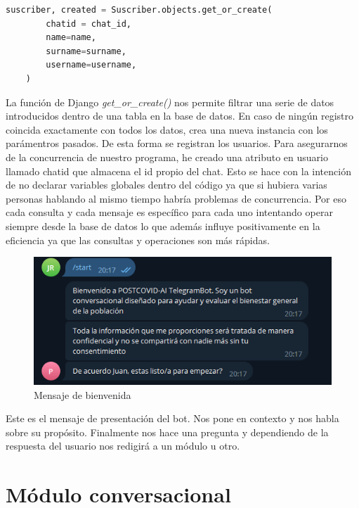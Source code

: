 \begin{lstlisting}[language=Python]
    suscriber, created = Suscriber.objects.get_or_create(
        chatid = chat_id,
        name=name,
        surname=surname,
        username=username,
    )
\end{lstlisting}


 La función de Django \textit{get\_or\_create()} nos permite filtrar una serie de datos introducidos dentro de una tabla en la base de datos. En caso de ningún registro coincida exactamente con todos los datos, crea una nueva instancia con los parámentros pasados. De esta forma se registran los usuarios. Para asegurarnos de la concurrencia de nuestro programa, he creado una atributo en usuario llamado chatid que almacena el id propio del chat. Esto se hace con la intención de no declarar variables globales dentro del código ya que si hubiera varias personas hablando al mismo tiempo habría problemas de concurrencia. Por eso cada consulta y cada mensaje es específico para cada uno intentando operar siempre desde la base de datos lo que además influye positivamente en la eficiencia ya que las consultas y operaciones son más rápidas.\vspace{1cm}


\begin{figure}[!ht]
    \centering
    \includegraphics[width=1\textwidth]{imagenes/welcome.png}
    \caption{ Mensaje de bienvenida }
    \label{fig:enter-label}
\end{figure}\vspace{0.3cm}

Este es el mensaje de presentación del bot. Nos pone en contexto y nos habla sobre su propósito. Finalmente nos hace una pregunta y dependiendo de la respuesta del usuario nos redigirá a un módulo u otro. 

\section{Módulo conversacional}

